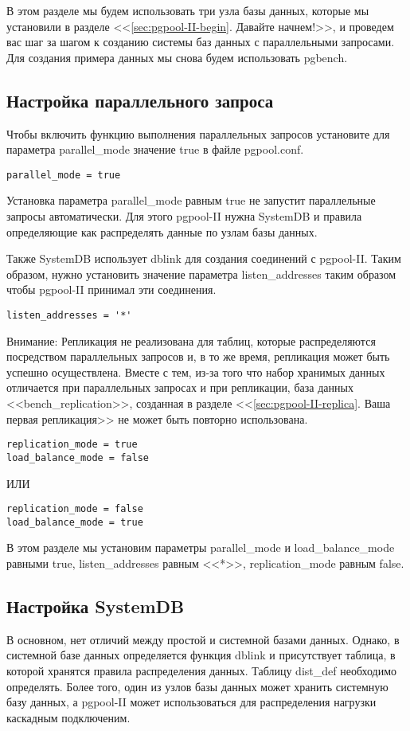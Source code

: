 В этом разделе мы будем использовать три узла базы данных, которые мы установили в разделе <<\ref{sec:pgpool-II-begin}. 
Давайте начнем!>>, и проведем вас шаг за шагом к созданию системы баз данных с параллельными запросами. 
Для создания примера данных мы снова будем использовать pgbench.

\subsection{Настройка параллельного запроса}
Чтобы включить функцию выполнения параллельных запросов установите для параметра parallel\_mode значение true в файле pgpool.conf.
\begin{verbatim}
parallel_mode = true
\end{verbatim}

Установка параметра parallel\_mode равным true не запустит параллельные запросы автоматически. 
Для этого pgpool-II нужна SystemDB и правила определяющие как распределять данные по узлам базы данных.

Также SystemDB использует dblink для создания соединений с pgpool-II. Таким образом, нужно установить значение 
параметра listen\_addresses таким образом чтобы pgpool-II принимал эти соединения.
\begin{verbatim}
listen_addresses = '*'
\end{verbatim}

Внимание: Репликация не реализована для таблиц, которые распределяются посредством параллельных запросов и, 
в то же время, репликация может быть успешно осуществлена. Вместе с тем, из-за того что набор хранимых данных 
отличается при параллельных запросах и при репликации, база данных <<bench\_replication>>, созданная в разделе
<<\ref{sec:pgpool-II-replica}. Ваша первая репликация>> не может быть повторно использована.
\begin{verbatim}
replication_mode = true
load_balance_mode = false
\end{verbatim}
ИЛИ
\begin{verbatim}
replication_mode = false
load_balance_mode = true
\end{verbatim}

В этом разделе мы установим параметры parallel\_mode и load\_balance\_mode равными true, 
listen\_addresses равным <<*>>, replication\_mode равным false.


\subsection{Настройка SystemDB}
В основном, нет отличий между простой и системной базами данных. Однако, в системной базе данных определяется функция 
dblink и присутствует таблица, в которой хранятся правила распределения данных. Таблицу dist\_def необходимо определять. 
Более того, один из узлов базы данных может хранить системную базу данных, а pgpool-II может использоваться для 
распределения нагрузки каскадным подключеним.

